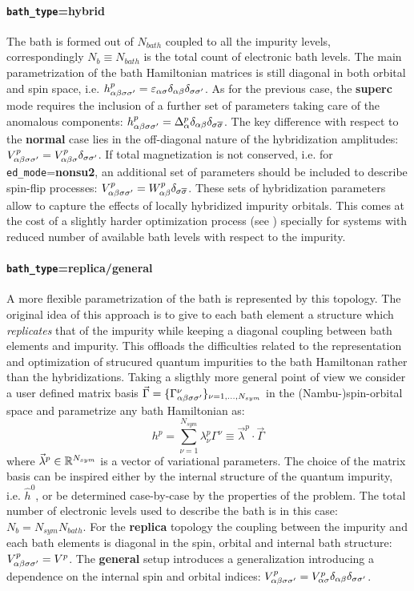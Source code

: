 \documentclass[edipack2.tex]{subfiles}
\begin{document}
\paragraph{{\tt bath\_type}={\bf hybrid}} The bath is formed out of
$N_{bath}$ coupled to all the impurity levels, correspondingly
$N_b\equiv N_{bath}$ is the total count of electronic bath levels. 
The main parametrization of the bath Hamiltonian matrices is still
diagonal in both orbital and spin space, i.e.
$h^p_{\alpha\beta\sigma\sigma'}=\varepsilon_{\alpha\sigma}\delta_{\alpha\beta}\delta_{\sigma\sigma'}$.
As for the previous case, the {\bf superc} mode requires the inclusion
of a further set of parameters taking care of the anomalous components:
$h^p_{\alpha\beta\sigma\sigma'}=\Delta^p_{\alpha}\delta_{\alpha\beta}\delta_{\sigma
  \overline{\sigma}}$.
The key difference with respect to the {\bf normal} case lies in the
off-diagonal nature of the hybridization amplitudes:
$V^p_{\alpha\beta\sigma\sigma'}=V^p_{\alpha\beta\sigma}\delta_{\sigma\sigma'}$. If total magnetization
is not conserved, i.e. for {\tt ed\_mode}={\bf nonsu2}, an additional
set of parameters should be included to describe spin-flip processes:
$V^p_{\alpha\beta\sigma\sigma'} = W^p_{\alpha\beta}\delta_{\sigma \overline{\sigma}}$. 
These sets of hybridization parameters allow to capture the effects of locally
hybridized impurity orbitals. This comes at the cost of a
slightly harder optimization process (see ) specially
for systems with reduced number of available bath levels with respect
to the impurity. 

\paragraph{{\tt bath\_type}={\bf replica}/{\bf general}} A more flexible
parametrization of the bath is represented by this topology. The
original idea of this approach is to give to each bath element a structure which {\it replicates}
that of the impurity while keeping a diagonal coupling between bath
elements and impurity. This offloads the difficulties related to the
representation and optimization of strucured quantum impurities to the
bath Hamiltonan rather than the hybridizations.
Taking a sligthly more general point of view we consider a user
defined matrix basis $\vec{\Gamma}=\{ \Gamma^\nu_{\alpha\beta\sigma\sigma'} \}_{\nu=1,\dots,N_{sym}}$ in the (Nambu-)spin-orbital
space and parametrize any bath Hamiltonian as:
$$
h^p = \sum_{\nu=1}^{N_{sym}} \lambda^p_\nu
\Gamma^\nu\equiv \vec{\lambda}^p\cdot \vec{\Gamma}
$$
where $\vec{\lambda}^p\in\mathbb{R}^{N_{sym}}$ is a vector of variational parameters. 
The choice of the matrix basis can be inspired either by the internal structure
of the quantum impurity, i.e. $\hat{h}^0$, or be determined
case-by-case by the properties of the problem.
The total number of electronic levels used to describe the bath is in
this case: $N_b = N_{sym} N_{bath}$. 
For the {\bf replica}  topology the coupling between the impurity and
each bath elements is diagonal in the spin, orbital and internal bath
structure: $V^p_{\alpha\beta\sigma\sigma'} = V^p$. The
{\bf general} setup introduces a generalization introducing a
dependence on the internal spin and orbital indices: $V^p_{\alpha\beta\sigma\sigma'}
= V^p_{\alpha\sigma}\delta_{\alpha\beta}\delta_{\sigma\sigma'}$. 
\end{document}
